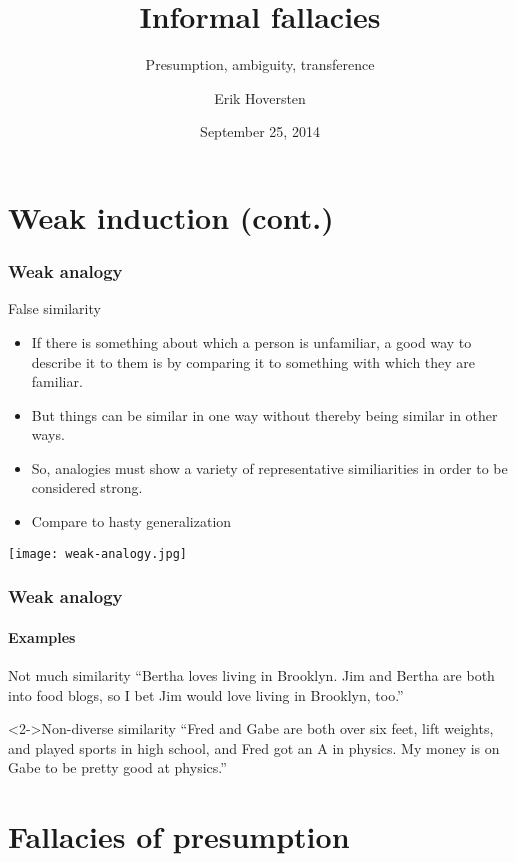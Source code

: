 \documentclass[10pt,letterpaper,xcolor=dvipsnames]{beamer}
\title{Informal fallacies}
\subtitle{Presumption, ambiguity, transference}
\author[Hoversten]{Erik Hoversten}
\institute[lrp-f14]{Logic, reason, and persuasion: fall 2014 \\ Rutgers University}
\date[09/25/2014]{September 25, 2014}
\begin{document}
\begin{frame}
\titlepage
\end{frame}

\section{Weak induction (cont.)}

\begin{frame}
  \frametitle{Weak analogy}
  
  \begin{block}{False similarity}
    \begin{itemize}
      \item If there is something about which a person is unfamiliar, a good way to describe it to them is by comparing it to something with which they are familiar.
      \item But things can be similar in one way without thereby being similar in other ways.
      \item So, analogies must show a variety of representative similiarities in order to be considered strong.
      \item Compare to hasty generalization
    \end{itemize}
  \end{block}
  
    \begin{center}
    \texttt{[image: weak-analogy.jpg]}
  \end{center}
  
\end{frame}

\begin{frame}
  \frametitle{Weak analogy}
  \framesubtitle{Examples}
  
  \begin{block}{Not much similarity}
    ``Bertha loves living in Brooklyn.  Jim and Bertha are both into food blogs, so I bet Jim would love living in Brooklyn, too.''
  \end{block}
  
  \begin{block}<2->{Non-diverse similarity}
    ``Fred and Gabe are both over six feet, lift weights, and played sports in high school, and Fred got an A in physics.  My money is on Gabe to be pretty good at physics.''
  \end{block}
  
\end{frame}

\section{Fallacies of presumption}
\end{document}

